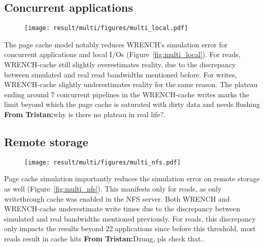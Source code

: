 \documentclass[conference]{IEEEtran}
\newcommand{\tristan}[1]{\color{orange}\textbf{From Tristan:}#1\color{black}}
\newcommand{\wrench}{WRENCH\xspace}
\begin{document}
        \subsection{Concurrent applications}

            \begin{figure*}
            \begin{subfigure}{\linewidth}
                \centering
                \texttt{[image: result/multi/figures/multi\_local.pdf]}
            \end{subfigure}
            \caption{Concurrent results with 3~GB files (averages on 5 repetitions)}
            \label{fig:multi_local}
            \end{figure*}

            The page cache model notably reduces \wrench's simulation error
            for concurrent applications and local I/Os
            (Figure~\ref{fig:multi_local}). For reads, \wrench-cache still
            slightly overestimates reality, due to the discrepancy between
            simulated and real read bandwidths mentioned before. For writes,
            \wrench-cache slightly underestimates reality for the same reason. The plateau
            ending around 7 concurrent pipelines in the \wrench-cache writes
            marks the limit beyond which the page cache is saturated with dirty data
            and needs flushing \tristan{why is there no plateau in real life?}.

        \subsection{Remote storage}

            \begin{figure*}
            \begin{subfigure}{\linewidth}
                \centering
                \texttt{[image: result/multi/figures/multi\_nfs.pdf]}
            \end{subfigure}
            \caption{NFS results with 3~GB files (averages on 5 repetitions)}
            \label{fig:multi_nfs}
            \end{figure*}

            Page cache simulation importantly reduces the simulation error
            on remote storage as well (Figure~\ref{fig:multi_nfs}). This
            manifests only for reads, as only writethrough cache was
            enabled in the NFS server. Both \wrench and \wrench-cache
            underestimate write times due to the discrepancy between
            simulated and real bandwidths mentioned previously. For reads,
            this discrepancy only impacts the results beyond 22
            applications since before this threshold, most reads result in cache
            hits \tristan{Dzung, pls check that.}.
\end{document}
